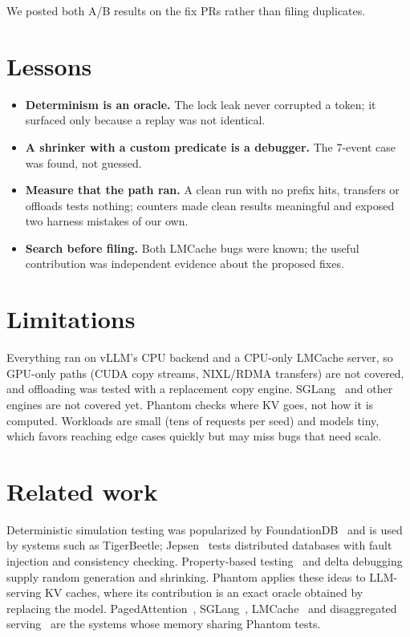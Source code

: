 \documentclass[10pt]{article}
\begin{document}
We posted both A/B results on the fix PRs rather than filing duplicates.

\section{Lessons}
\begin{itemize}
\item \textbf{Determinism is an oracle.} The lock leak never corrupted a
token; it surfaced only because a replay was not identical.
\item \textbf{A shrinker with a custom predicate is a debugger.} The 7-event
case was found, not guessed.
\item \textbf{Measure that the path ran.} A clean run with no prefix hits,
transfers or offloads tests nothing; counters made clean results meaningful
and exposed two harness mistakes of our own.
\item \textbf{Search before filing.} Both LMCache bugs were known; the useful
contribution was independent evidence about the proposed fixes.
\end{itemize}

\section{Limitations}
Everything ran on vLLM's CPU backend and a CPU-only LMCache server, so
GPU-only paths (CUDA copy streams, NIXL/RDMA transfers) are not covered, and
offloading was tested with a replacement copy engine. SGLang~\cite{zheng2024sglang}
and other engines are not covered yet. Phantom checks where KV goes, not
how it is computed. Workloads are small (tens of requests per seed) and
models tiny, which favors reaching edge cases quickly but may miss bugs that
need scale.

\section{Related work}
Deterministic simulation testing was popularized by
FoundationDB~\cite{zhou2021fdb} and is used by systems such as TigerBeetle;
Jepsen~\cite{jepsen} tests distributed databases with fault injection and
consistency checking. Property-based testing~\cite{claessen2000quickcheck}
and delta debugging~\cite{zeller2002ddmin} supply random generation and
shrinking. Phantom applies these ideas to LLM-serving KV caches, where its
contribution is an exact oracle obtained by replacing the model.
PagedAttention~\cite{kwon2023vllm}, SGLang~\cite{zheng2024sglang},
LMCache~\cite{liu2025lmcache} and disaggregated
serving~\cite{zhong2024distserve,patel2024splitwise} are the systems whose
memory sharing Phantom tests.
\end{document}
